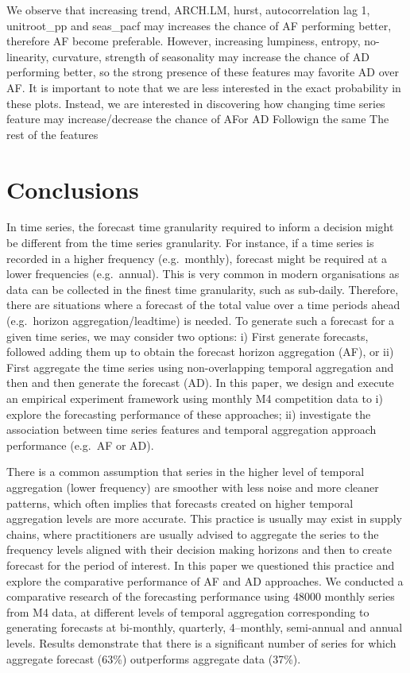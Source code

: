 \documentclass[]{elsarticle} %
\begin{document}
We observe that increasing trend, ARCH.LM, hurst, autocorrelation lag 1,
unitroot\_pp and seas\_pacf may increases the chance of AF performing
better, therefore AF become preferable. However, increasing lumpiness,
entropy, no-linearity, curvature, strength of seasonality may increase
the chance of AD performing better, so the strong presence of these
features may favorite AD over AF. It is important to note that we are
less interested in the exact probability in these plots. Instead, we are
interested in discovering how changing time series feature may
increase/decrease the chance of AFor AD Followign the same The rest of
the features

\hypertarget{con}{%
\section{Conclusions}\label{con}}

In time series, the forecast time granularity required to inform a
decision might be different from the time series granularity. For
instance, if a time series is recorded in a higher frequency
(e.g.~monthly), forecast might be required at a lower frequencies
(e.g.~annual). This is very common in modern organisations as data can
be collected in the finest time granularity, such as sub-daily.
Therefore, there are situations where a forecast of the total value over
a time periods ahead (e.g.~horizon aggregation/leadtime) is needed. To
generate such a forecast for a given time series, we may consider two
options: i) First generate forecasts, followed adding them up to obtain
the forecast horizon aggregation (AF), or ii) First aggregate the time
series using non-overlapping temporal aggregation and then and then
generate the forecast (AD). In this paper, we design and execute an
empirical experiment framework using monthly M4 competition data to i)
explore the forecasting performance of these approaches; ii) investigate
the association between time series features and temporal aggregation
approach performance (e.g.~AF or AD).

There is a common assumption that series in the higher level of temporal
aggregation (lower frequency) are smoother with less noise and more
cleaner patterns, which often implies that forecasts created on higher
temporal aggregation levels are more accurate. This practice is usually
may exist in supply chains, where practitioners are usually advised to
aggregate the series to the frequency levels aligned with their decision
making horizons and then to create forecast for the period of interest.
In this paper we questioned this practice and explore the comparative
performance of AF and AD approaches. We conducted a comparative research
of the forecasting performance using 48000 monthly series from M4 data,
at different levels of temporal aggregation corresponding to generating
forecasts at bi-monthly, quarterly, 4--monthly, semi-annual and annual
levels. Results demonstrate that there is a significant number of series
for which aggregate forecast (63\%) outperforms aggregate data (37\%).
\end{document}
